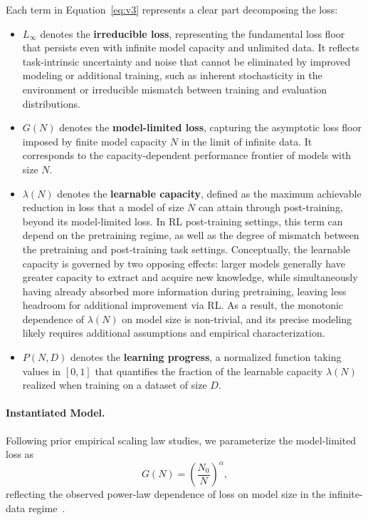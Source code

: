 Each term in Equation~\eqref{eq:v3} represents a clear part decomposing the loss:
\begin{itemize}
    \item $L_{\infty}$ denotes the \textbf{irreducible loss}, representing the fundamental loss floor that persists even with infinite model capacity and unlimited data. It reflects task-intrinsic uncertainty and noise that cannot be eliminated by improved modeling or additional training, such as inherent stochasticity in the environment or irreducible mismatch between training and evaluation distributions.
    
    \item $G(N)$ denotes the \textbf{model-limited loss}, capturing the asymptotic loss floor imposed by finite model capacity $N$ in the limit of infinite data. It corresponds to the capacity-dependent performance frontier of models with size $N$.

    \item $\lambda(N)$ denotes the \textbf{learnable capacity}, defined as the maximum achievable reduction in loss that a model of size $N$ can attain through post-training, beyond its model-limited loss. 
    In RL post-training settings, this term can depend on the pretraining regime, as well as the degree of mismatch between the pretraining and post-training task settings.
    Conceptually, the learnable capacity is governed by two opposing effects: larger models generally have greater capacity to extract and acquire new knowledge, while simultaneously having already absorbed more information during pretraining, leaving less headroom for additional improvement via RL.
    As a result, the monotonic dependence of $\lambda(N)$ on model size is non-trivial, and its precise modeling likely requires additional assumptions and empirical characterization.
    
    \item $P(N,D)$ denotes the \textbf{learning progress}, a normalized function taking values in $[0,1]$ that quantifies the fraction of the learnable capacity $\lambda(N)$ realized when training on a dataset of size $D$.
\end{itemize}

\paragraph{Instantiated Model.}
Following prior empirical scaling law studies, we parameterize the model-limited loss as
\begin{equation}
    G(N) = \left(\frac{N_0}{N}\right)^{\alpha},
\end{equation}
reflecting the observed power-law dependence of loss on model size in the infinite-data regime~\citep{kaplan2020scaling}.

